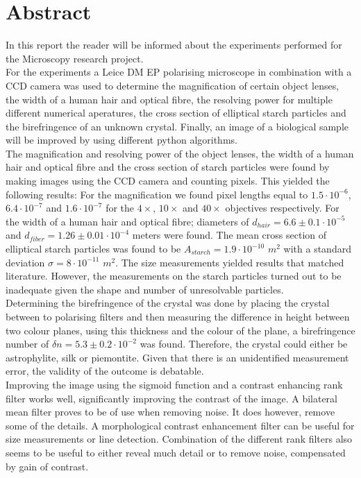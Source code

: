 \section*{Abstract}
In this report the reader will be informed about the experiments performed for the Microscopy research project.\\
For the experiments a Leice DM EP polarising microscope in combination with a CCD camera was used to determine the magnification of certain object lenses, the width of a human hair and optical fibre, the resolving power for multiple different numerical aperatures, the cross section of elliptical starch particles and the birefringence of an unknown crystal. Finally, an image of a biological sample will be improved by using different python algorithms.\\
The magnification and resolving power of the object lenses, the width of a human hair and optical fibre and the cross section of starch particles were found by making images using the CCD camera and counting pixels. This yielded the following results: For the magnification we found pixel lengths equal to $1.5\cdot10^{-6}$, $6.4\cdot10^{-7}$ and $1.6\cdot10^{-7}$ for the $4\times$, $10\times$ and $40\times$ objectives respectively. For the width of a human hair and optical fibre; diameters of $d_{hair}=6.6\pm0.1\cdot10^{-5}$ and $d_{fiber} = 1.26\pm0.01\cdot10^{-4}$ meters were found. The mean cross section of elliptical starch particles was found to be $A_{starch}=1.9\cdot10^{-10}$ $m^2$ with a standard deviation $\sigma = 8 \cdot10^{-11}$ $m^2$. The size measurements yielded results that matched literature. However, the measurements on the starch particles turned out to be inadequate given the shape and number of unresolvable particles.\\
Determining the birefringence of the crystal was done by placing the crystal between to polarising filters and then measuring the difference in height between two colour planes, using this thickness and the colour of the plane, a birefringence number of $\delta n = 5.3\pm0.2\cdot10^{-2}$ was found. Therefore, the crystal could either be astrophylite, silk or piemontite. Given that there is an unidentified measurement error, the validity of the outcome is debatable.\\
Improving the image using the sigmoid function and a contrast enhancing rank filter works well, significantly improving the contrast of the image. A bilateral mean filter proves to be of use when removing noise. It does however, remove some of the details. A morphological contrast enhancement filter can be useful for size measurements or line detection. Combination of the different rank filters also seems to be useful to either reveal much detail or to remove noise, compensated by gain of contrast.